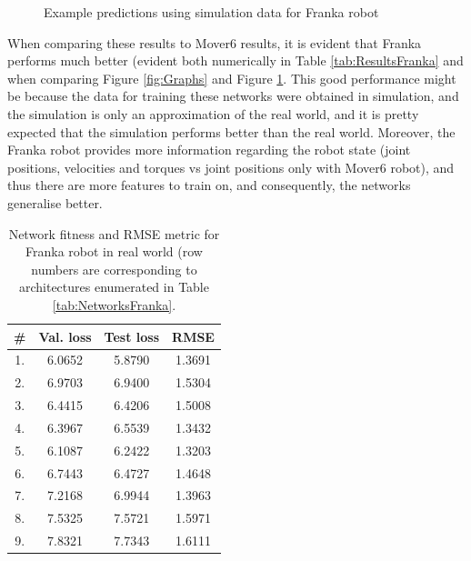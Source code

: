 \begin{figure}
    \hfil
    \caption{Example predictions using simulation data for Franka robot}
    \label{fig:SimGraphs}
\end{figure}

When comparing these results to Mover6 results, it is evident that Franka performs much better (evident both numerically in Table \ref{tab:ResultsFranka} and when comparing Figure \ref{fig:Graphs} and Figure \ref{fig:SimGraphs}. This good performance might be because the data for training these networks were obtained in simulation, and the simulation is only an approximation of the real world, and it is pretty expected that the simulation performs better than the real world. Moreover, the Franka robot provides more information regarding the robot state (joint positions, velocities and torques vs joint positions only with Mover6 robot), and thus there are more features to train on, and consequently, the networks generalise better.

\begin{table}
    \caption[Network fitness and RMSE metric for Franka robot (real world)]{Network fitness and RMSE metric for Franka robot in real world (row numbers are corresponding to architectures enumerated in Table \ref{tab:NetworksFranka}.}
    \label{tab:ResultsFrankaReal}
    \centering
    \begin{tabular}{|c|c|c|c|}
        \hline
        \textbf{\#} & \textbf{Val. loss} & \textbf{Test loss} & \textbf{RMSE} \\
        \hline
        \hline
        1. & 6.0652 & 5.8790 & 1.3691 \\ %
        \hline
        2. & 6.9703 & 6.9400 & 1.5304   \\ %
        \hline
        3. & 6.4415 & 6.4206 & 1.5008 \\ %
        \hline
        4. & 6.3967 & 6.5539 & 1.3432 \\ %
        \hline
        5. & 6.1087 & 6.2422 & 1.3203 \\ %
        \hline
        6. & 6.7443 & 6.4727 & 1.4648 \\ %
        \hline
        7. & 7.2168 & 6.9944 & 1.3963 \\ %
        \hline
        8. & 7.5325 & 7.5721 & 1.5971 \\ %
        \hline
        9. & 7.8321 & 7.7343 & 1.6111 \\ %
        \hline
    \end{tabular}
\end{table}

